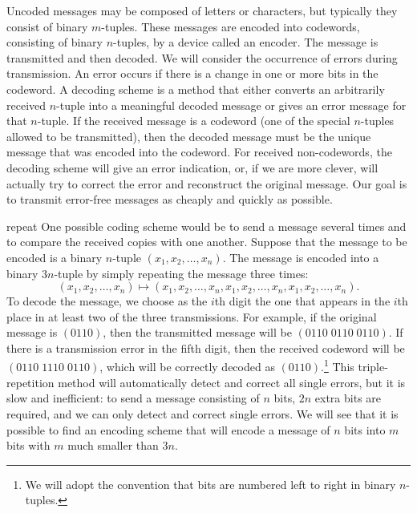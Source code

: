 Uncoded messages may be composed of letters or characters, but
typically they consist of binary $m$-tuples. These messages are
encoded into codewords, consisting of binary $n$-tuples, by a device
called an {\bfi encoder}. The message is transmitted and then decoded.
We will consider the occurrence of errors during transmission. An
{\bfi error\/} occurs if there is a change in one or more bits in the
codeword. A {\bfi decoding scheme\/} is a method that either converts
an arbitrarily received $n$-tuple into a meaningful decoded message or
gives an error message for that $n$-tuple. If the received message is
a codeword (one of the special $n$-tuples allowed to be transmitted),
then the decoded message must be the unique message that was encoded
into the codeword. For received non-codewords, the decoding scheme will
give an error indication, or, if we are more clever, will actually try
to correct the error and reconstruct the original message. Our goal is
to transmit error-free messages as cheaply and quickly as possible.
 
 
\begin{example}{repeat}
One possible coding scheme would be to send a message several
times and to compare the received copies with one another. Suppose
that the message to be encoded is a binary $n$-tuple $(x_{1}, x_{2},
\ldots, x_{n})$. The message is encoded into a binary $3n$-tuple by
simply repeating the message three times: 
\[
(x_{1}, x_{2}, \ldots, x_{n})
\mapsto
(x_{1}, x_{2}, \ldots, x_{n}, x_{1}, x_{2}, \ldots, x_{n},
x_{1}, x_{2}, \ldots, x_{n}).
\]
To decode the message, we choose as the $i$th digit the one that
appears in the $i$th place in at least two of the three transmissions.
For example, if the original message is $(0110)$, then the transmitted
message will be \mbox{$(0110\;  0110\;  0110)$}. If there is a transmission error
in the fifth digit, then the received codeword will be
$(0110\;  1110\;  0110)$, which will be correctly decoded as
$(0110)$.\footnote{We will adopt the convention that bits are numbered
left to right in binary $n$-tuples.} 
This triple-repetition method will automatically detect and correct
all single errors, but it is slow and inefficient: to send a message
consisting of $n$ bits, $2n$ extra bits are required, and we can only
detect and correct single errors. We will see that it is possible to
find an encoding scheme that will encode a message of $n$ bits into
$m$ bits with $m$ much smaller than $3n$.
\end{example}
 
